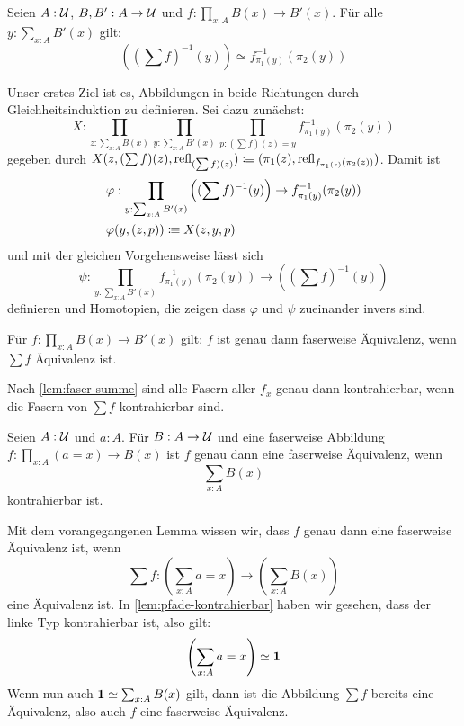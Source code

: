 \begin{lemma}
  \label{lem:faser-summe}
  Seien $A:\mathcal{U}$, $B,B':A\to\mathcal{U}$ und $f:\prod_{x:A}B(x)\to B'(x)$. Für alle $y:\sum_{x:A}B'(x)$ gilt:
  \[
    \left((\sum f)^{-1}(y)\right)\simeq f_{\pi_1(y)}^{-1}(\pi_2(y))
  \]
\end{lemma}
\begin{beweis}
  Unser erstes Ziel ist es, Abbildungen in beide Richtungen durch Gleichheitsinduktion zu definieren.
  Sei dazu zunächst:
  \[
    X:\prod_{z:\sum_{x:A}B(x)}\prod_{y:\sum_{x:A}B'(x)}\prod_{p:(\sum f) (z) = y} f_{\pi_1(y)}^{-1}(\pi_2(y))
  \]
  gegeben durch $X(z,(\sum f) (z), \mathrm{refl}_{(\sum f) (z)})\vcentcolon\mspace{-1.2mu}\equiv(\pi_1(z),\mathrm{refl}_{f_{\pi_1(z)}(\pi_2(z))})$. Damit ist
  \begin{align*}
    &\varphi:\prod_{y:\sum_{x:A}B'(x)}\left((\sum f)^{-1}(y)\right)\to f_{\pi_1(y)}^{-1}(\pi_2(y)) \\
    &\varphi(y,(z,p))\vcentcolon\mspace{-1.2mu}\equiv X(z,y,p)
  \end{align*}
  und mit der gleichen Vorgehensweise lässt sich
  \[
    \psi:\prod_{y:\sum_{x:A}B'(x)}f_{\pi_1(y)}^{-1}(\pi_2(y)) \to \left((\sum f)^{-1}(y)\right)
  \]
  definieren und Homotopien, die zeigen dass $\varphi$ und $\psi$ zueinander invers sind.
\end{beweis}

\begin{lemma}
  Für $f:\prod_{x:A}B(x)\to B'(x)$ gilt: $f$ ist genau dann faserweise Äquivalenz, wenn $\sum f$ Äquivalenz ist.
\end{lemma}
\begin{beweis}
  Nach \cref{lem:faser-summe} sind alle Fasern aller $f_x$ genau dann kontrahierbar, wenn die Fasern von $\sum f$ kontrahierbar sind.
\end{beweis}

\begin{theorem}
  \label{thm:fundamental-gleichheit}
  Seien $A:\mathcal{U}$ und $a:A$. Für $B:A\to \mathcal{U}$ und eine faserweise Abbildung $f:\prod_{x:A}(a=x)\to B(x)$ ist $f$ genau dann eine faserweise Äquivalenz, wenn
  \[
    \sum_{x:A}B(x)
  \]
  kontrahierbar ist.
\end{theorem}
\begin{beweis}
  Mit dem vorangegangenen Lemma wissen wir, dass $f$ genau dann eine faserweise Äquivalenz ist, wenn
  \[
    \sum f:\left(\sum_{x:A}a=x\right)\to \left(\sum_{x:A}B(x)\right)
  \]
  eine Äquivalenz ist. In \cref{lem:pfade-kontrahierbar} haben wir gesehen, dass der linke Typ kontrahierbar ist, also gilt:
  \[
    \left(\sum_{x:A}a=x\right)\simeq \mathbf{1}
  \]
  Wenn nun auch $\mathbf{1}\simeq \sum_{x:A}B(x)$ gilt, dann ist die Abbildung $\sum f$ bereits eine Äquivalenz, also auch $f$ eine faserweise Äquivalenz.
\end{beweis}

